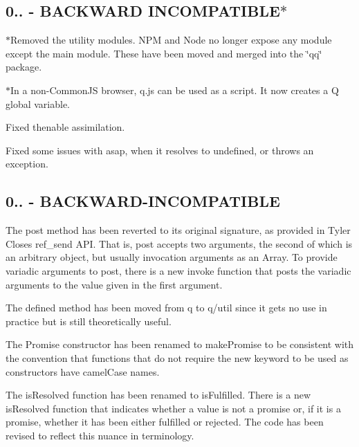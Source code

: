 \subsection*{0.. -\/ B\+A\+C\+K\+W\+A\+RD I\+N\+C\+O\+M\+P\+A\+T\+I\+B\+L\+E$\ast$}


\begin{DoxyItemize}
\item $\ast$\+Removed the utility modules. N\+PM and Node no longer expose any module except the main module. These have been moved and merged into the \char`\"{}qq\char`\"{} package.
\item $\ast$\+In a non-\/\+Common\+JS browser, q.\+js can be used as a script. It now creates a Q global variable.
\item Fixed thenable assimilation.
\item Fixed some issues with asap, when it resolves to undefined, or throws an exception.
\end{DoxyItemize}

\subsection*{0.. -\/ B\+A\+C\+K\+W\+A\+R\+D-\/\+I\+N\+C\+O\+M\+P\+A\+T\+I\+B\+LE}


\begin{DoxyItemize}
\item The {\ttfamily post} method has been reverted to its original signature, as provided in Tyler Close\textquotesingle{}s {\ttfamily ref\+\_\+send} A\+PI. That is, {\ttfamily post} accepts two arguments, the second of which is an arbitrary object, but usually invocation arguments as an {\ttfamily Array}. To provide variadic arguments to {\ttfamily post}, there is a new {\ttfamily invoke} function that posts the variadic arguments to the value given in the first argument.
\item The {\ttfamily defined} method has been moved from {\ttfamily q} to {\ttfamily q/util} since it gets no use in practice but is still theoretically useful.
\item The {\ttfamily Promise} constructor has been renamed to {\ttfamily make\+Promise} to be consistent with the convention that functions that do not require the {\ttfamily new} keyword to be used as constructors have camel\+Case names.
\item The {\ttfamily is\+Resolved} function has been renamed to {\ttfamily is\+Fulfilled}. There is a new {\ttfamily is\+Resolved} function that indicates whether a value is not a promise or, if it is a promise, whether it has been either fulfilled or rejected. The code has been revised to reflect this nuance in terminology.
\end{DoxyItemize}

